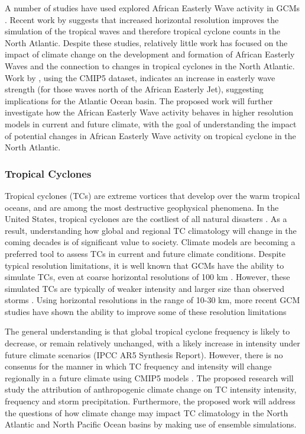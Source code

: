 \documentclass[11pt]{article}
\begin{document}
A number of studies have used explored African Easterly Wave activity in GCMs \citep{Ruit&DellAquila2010,Daloz2012,Skinner&Diffenbaugh2013,McCrary2014}. Recent work by \citet{Roberts2015} suggests that increased horizontal resolution improves the simulation of the tropical waves and therefore tropical cyclone counts in the North Atlantic.  Despite these studies, relatively little work has focused on the impact of climate change on the development and formation of African Easterly Waves and the connection to changes in tropical cyclones in the North Atlantic. Work by \citet{Skinner&Diffenbaugh2013}, using the CMIP5 dataset, indicates an increase in easterly wave strength (for those waves north of the African Easterly Jet), suggesting implications for the Atlantic Ocean basin. The proposed work will  further investigate how the African Easterly Wave activity behaves in higher resolution models in current and future climate, with the goal of understanding the impact of potential changes in African Easterly Wave activity on tropical cyclone in the North Atlantic.

\subsubsection{Tropical Cyclones}
Tropical cyclones (TCs) are extreme vortices that develop over the warm tropical oceans, and are among the most destructive geophysical phenomena. In the United States, tropical cyclones are the costliest of all natural disasters \citep{Pielke1998}. As a result, understanding how global and regional TC climatology will change in the coming decades is of significant value to society. Climate models are becoming a preferred tool to assess TCs in current and future climate conditions. Despite typical resolution limitations, it is well known that GCMs have the ability to simulate TCs, even at coarse horizontal resolutions of 100 km \citep{Knutson2010}. However, these simulated TCs are typically of weaker intensity and larger size than observed storms \citep{Walsh2007}. Using horizontal resolutions in the range of 10-30 km, more recent GCM studies have shown the ability to improve some of these resolution limitations \citep{Murakami2012,Manganello2012, Bacmeister2014, Wehner2014}

The general understanding is that global tropical cyclone frequency is likely to decrease, or remain relatively unchanged, with a likely increase in intensity under future climate scenarios (IPCC AR5 Synthesis Report). However, there is no consenus for the manner in which TC frequency and intensity will change regionally in a future climate using CMIP5 models \citep{Camargo2013}. The proposed research will study the attribution of anthropogenic climate change on TC intensity intensity, frequency and storm precipitation. Furthermore, the proposed work will address the questions of how climate change may impact TC climatology in the North Atlantic and North Pacific Ocean basins by making use of ensemble simulations.  
\end{document}
